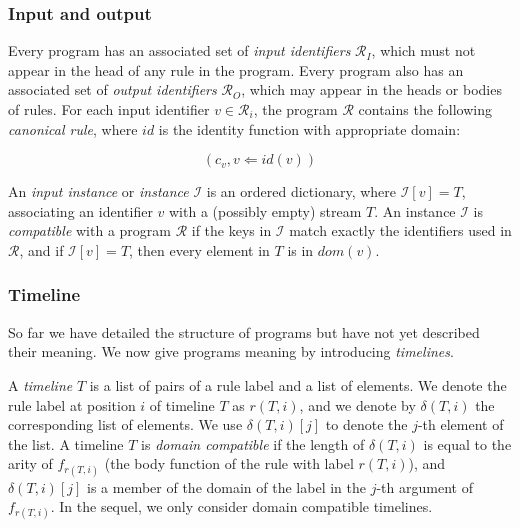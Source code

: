 \subsubsection{Input and output}

Every program has an associated set of {\em input identifiers} $\mathcal{R}_I$, which must not appear in the head of any rule in the program.  Every program also has an associated set of {\em output identifiers} $\mathcal{R}_O$, which may appear in the heads or bodies of rules.  For each input identifier $v \in \mathcal{R}_i$, the program $\mathcal{R}$ contains the following {\em canonical rule}, where $id$ is the identity function with appropriate domain:

$$(c_v, v \Leftarrow id(v)) $$

An {\em input instance} or {\em instance} $\mathcal{I}$ is an ordered dictionary, where $\mathcal{I}[v] = T$, associating an identifier $v$ with a (possibly empty) stream $T$.  An instance $\mathcal{I}$ is {\em compatible} with a program $\mathcal{R}$ if the keys in $\mathcal{I}$ match exactly the identifiers used in $\mathcal{R}$, and if $\mathcal{I}[v] = T$, then every element in $T$ is in $dom(v)$.

\subsubsection{Timeline}

So far we have detailed the structure of programs but have not yet described their meaning.  We now give programs meaning by introducing {\em timelines}.

A {\em timeline} $T$ is a list of pairs of a rule label and a list of elements.  We denote the rule label at position $i$ of timeline $T$ as $r(T, i)$, and we denote by $\delta(T, i)$ the corresponding list of elements.  We use $\delta(T,i)[j]$ to denote the $j$-th element of the list.  A timeline $T$ is {\em domain compatible} if the length of $\delta(T, i)$ is equal to the arity of $f_{r(T,i)}$ (the body function of the rule with label $r(T,i)$), and $\delta(T,i)[j]$ is a member of the domain of the label in the $j$-th argument of $f_{r(T,i)}$.  In the sequel, we only consider domain compatible timelines.

